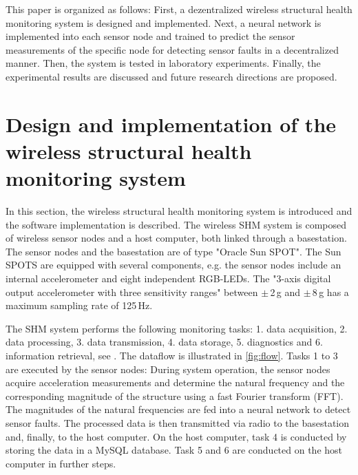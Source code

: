 \documentclass[12pt,a4paper]{scrartcl}
\begin{document}
This paper is organized as follows:
First, a dezentralized wireless structural health monitoring system is designed and implemented. 
Next, a neural network is implemented into each sensor node and trained to predict the sensor measurements of the specific node for detecting sensor faults in a decentralized manner. 
Then, the system is tested in laboratory experiments. 
Finally, the experimental results are discussed and future research directions are proposed.



\section*{Design and implementation of the wireless structural health monitoring system}
In this section, the wireless structural health monitoring system is introduced and the software implementation is described.
The wireless SHM system is composed of wireless sensor nodes and a host computer, both linked through a basestation.
The sensor nodes and the basestation are of type "Oracle Sun SPOT". 
The Sun SPOTS are equipped with several components, e.g. the sensor nodes include an internal accelerometer and eight independent RGB-LEDs.
The "3-axis digital output accelerometer with three sensitivity ranges" \citep{eDemo2010} between $\pm$\,2\,g and $\pm$\,8\,g has a maximum sampling rate of 125\,Hz.

The SHM system performs the following monitoring tasks:
1. data acquisition,
2. data processing,
3. data transmission, 
4. data storage,
5. diagnostics and 
6. information retrieval, see \citet{BisbySHM}.
The dataflow is illustrated in \autoref{fig:flow}.
Tasks 1 to 3 are executed by the sensor nodes: During system operation, the sensor nodes acquire acceleration measurements and
determine the natural frequency and the corresponding magnitude of the structure using a fast Fourier transform (FFT).
The magnitudes of the natural frequencies are fed into a neural network to detect sensor faults.
The processed data is then transmitted via radio to the basestation and, finally, to the host computer.
On the host computer, task 4 is conducted by storing the data in a MySQL database.
Task 5 and 6 are conducted on the host computer in further steps.
\end{document}
